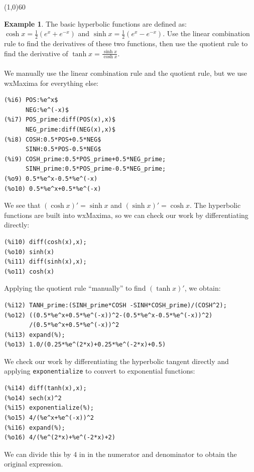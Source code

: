 \documentclass[10.5pt,twoside]{report}
\theoremstyle{definition}
\newtheorem{exmp}{Example}[section]
\begin{document}
\line(1,0){60}
\linethickness{0.5mm}


\begin{exmp}

The basic hyperbolic functions are defined as: $\cosh{x}=\frac{1}{2}(e^x+e^{-x})$ and $\sinh{x}=\frac{1}{2}(e^x-e^{-x})$.  Use the linear combination rule to find the derivatives of these two functions, then use the quotient rule to find the derivative of $\tanh{x}=\frac{\sinh{x}}{\cosh{x}}$.\\
${}$\\

We manually use the linear combination rule and the quotient rule, but we use wxMaxima for everything else:

\begin{verbatim}
(%i6) POS:%e^x$
      NEG:%e^(-x)$
(%i7) POS_prime:diff(POS(x),x)$
      NEG_prime:diff(NEG(x),x)$
(%i8) COSH:0.5*POS+0.5*NEG$
      SINH:0.5*POS-0.5*NEG$      
(%i9) COSH_prime:0.5*POS_prime+0.5*NEG_prime;
      SINH_prime:0.5*POS_prime-0.5*NEG_prime;
(%o9) 0.5*%e^x-0.5*%e^(-x)
(%o10) 0.5*%e^x+0.5*%e^(-x)
\end{verbatim}

We see that $(\cosh{x})'=\sinh{x}$ and $(\sinh{x})'=\cosh{x}$.  The hyperbolic functions are built into wxMaxima, so we can check our work by differentiating directly:

\begin{verbatim}
(%i10) diff(cosh(x),x);
(%o10) sinh(x)
(%i11) diff(sinh(x),x);
(%o11) cosh(x)
\end{verbatim}

Applying the quotient rule ``manually'' to find $(\tanh{x})'$, we obtain:

\begin{verbatim}
(%i12) TANH_prime:(SINH_prime*COSH -SINH*COSH_prime)/(COSH^2);
(%o12) ((0.5*%e^x+0.5*%e^(-x))^2-(0.5*%e^x-0.5*%e^(-x))^2)
       /(0.5*%e^x+0.5*%e^(-x))^2
(%i13) expand(%);
(%o13) 1.0/(0.25*%e^(2*x)+0.25*%e^(-2*x)+0.5)
\end{verbatim}

We check our work by differentiating the hyperbolic tangent directly and applying \verb|exponentialize| to convert to exponential functions:

\begin{verbatim}
(%i14) diff(tanh(x),x);
(%o14) sech(x)^2
(%i15) exponentialize(%);
(%o15) 4/(%e^x+%e^(-x))^2
(%i16) expand(%);
(%o16) 4/(%e^(2*x)+%e^(-2*x)+2)
\end{verbatim}

We can divide this by 4 in in the numerator and denominator to obtain the original expression.
\end{exmp}
\end{document}
